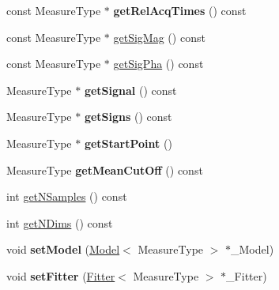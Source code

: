 \begin{DoxyCompactItemize}
\item 
\hypertarget{class_ox_1_1_calculator_a6698aa9563e9c7d251d4ff73810dd12c}{const Measure\-Type $\ast$ {\bfseries get\-Rel\-Acq\-Times} () const }\label{class_ox_1_1_calculator_a6698aa9563e9c7d251d4ff73810dd12c}

\item 
const Measure\-Type $\ast$ \hyperlink{class_ox_1_1_calculator_ad9a623ee2bfc77732fa891c47c087aa9}{get\-Sig\-Mag} () const 
\item 
const Measure\-Type $\ast$ \hyperlink{class_ox_1_1_calculator_acf6021ef084c24636a344a12627caff5}{get\-Sig\-Pha} () const 
\item 
\hypertarget{class_ox_1_1_calculator_a10c8a3e18079c680cbdf54366d5dfed0}{Measure\-Type $\ast$ {\bfseries get\-Signal} () const }\label{class_ox_1_1_calculator_a10c8a3e18079c680cbdf54366d5dfed0}

\item 
\hypertarget{class_ox_1_1_calculator_ac05783e37c8e6f3f457778ebbfa2e6a5}{Measure\-Type $\ast$ {\bfseries get\-Signs} () const }\label{class_ox_1_1_calculator_ac05783e37c8e6f3f457778ebbfa2e6a5}

\item 
\hypertarget{class_ox_1_1_calculator_aebf55897e1f11cdd3afec75d24c8ea13}{Measure\-Type $\ast$ {\bfseries get\-Start\-Point} ()}\label{class_ox_1_1_calculator_aebf55897e1f11cdd3afec75d24c8ea13}

\item 
\hypertarget{class_ox_1_1_calculator_a8232921e636ebc91a102bc2e95596a7b}{Measure\-Type {\bfseries get\-Mean\-Cut\-Off} () const }\label{class_ox_1_1_calculator_a8232921e636ebc91a102bc2e95596a7b}

\item 
int \hyperlink{class_ox_1_1_calculator_a5e5b6e1af84b8713c833a25d7c0dd90d}{get\-N\-Samples} () const 
\item 
int \hyperlink{class_ox_1_1_calculator_a3a4266dedca7e02707e732a312b85048}{get\-N\-Dims} () const 
\item 
\hypertarget{class_ox_1_1_calculator_ab814b8876ab6ddd7585f73dd23024624}{void {\bfseries set\-Model} (\hyperlink{class_ox_1_1_model}{Model}$<$ Measure\-Type $>$ $\ast$\-\_\-\-Model)}\label{class_ox_1_1_calculator_ab814b8876ab6ddd7585f73dd23024624}

\item 
\hypertarget{class_ox_1_1_calculator_a65d901e63b2f59b77a7dea82eaaa8215}{void {\bfseries set\-Fitter} (\hyperlink{class_ox_1_1_fitter}{Fitter}$<$ Measure\-Type $>$ $\ast$\-\_\-\-Fitter)}\label{class_ox_1_1_calculator_a65d901e63b2f59b77a7dea82eaaa8215}


\end{DoxyCompactItemize}
